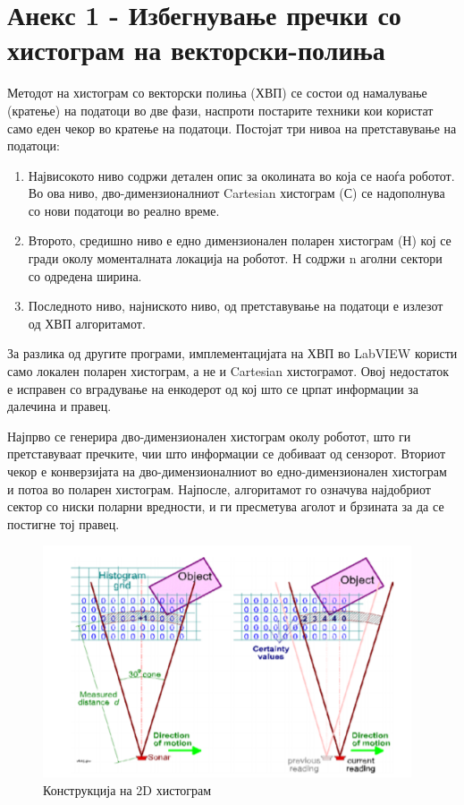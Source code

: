 \documentclass[12pt]{article}
\begin{document}
\newpage

\section{Анекс 1 - Избегнување пречки со хистограм на векторски-полиња} %
  \label{sec:app1-avoidance}
  Методот на хистограм со векторски полиња (ХВП) се состои од намалување (кратење) на податоци во две фази, наспроти постарите техники кои користат само еден чекор во кратење на податоци. Постојат три нивоа на претставување на податоци:

  \begin{enumerate}
    \item Највисокото ниво содржи детален опис за околината во која се наоѓа роботот. Во ова ниво, дво-димензионалниот Cartesian хистограм (С) се надополнува со нови податоци во реално време.
    \item Второто, средишно ниво е едно димензионален поларен хистограм (Н) кој се гради околу моменталната локација на роботот. Н содржи n аголни сектори со одредена ширина.
    \item Последното ниво, најниското ниво, од претставување на податоци е излезот од ХВП алгоритамот.
    \end{enumerate}

  За разлика од другите програми, имплементацијата на ХВП во LabVIEW користи само локален поларен хистограм, а не и Cartesian хистограмот. Овој недостаток е исправен со вградување на енкодерот од кој што се црпат информации за далечина и правец.

  Најпрво се генерира дво-димензионален хистограм околу роботот, што ги претставуваат пречките, чии што информации се добиваат од сензорот. Вториот чекор е конверзијата на дво-димензионалниот во едно-димензионален хистограм и потоа во поларен хистограм. Најпосле, алгоритамот го означува најдобриот сектор со ниски поларни вредности, и ги пресметува аголот и брзината за да се постигне тој правец.

  \begin{figure}[H]
    \centering
    \includegraphics[width=0.35\linewidth]{./images/2d_his.png}
    \caption{Конструкција на 2D хистограм}
    \label{fig:2d_his.png}
    \end{figure}
\end{document}
